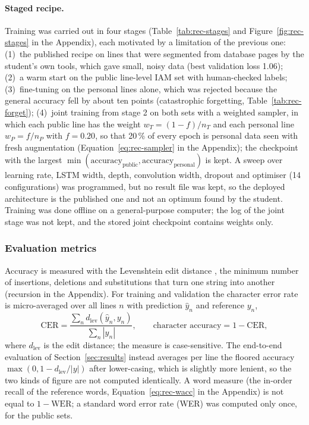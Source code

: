 \paragraph{Staged recipe.}
Training was carried out in four stages (Table~\ref{tab:rec-stages} and Figure~\ref{fig:rec-stages} in the Appendix), each motivated by a limitation of the previous one:
(1)~the published recipe on lines that were segmented from database pages by the student's own tools, which gave small, noisy data (best validation loss 1.06);
(2)~a warm start on the public line-level IAM set with human-checked labels;
(3)~fine-tuning on the personal lines alone, which was rejected because the general accuracy fell by about ten points (catastrophic forgetting, Table~\ref{tab:rec-forget});
(4)~joint training from stage 2 on both sets with a weighted sampler, in which each public line has the weight $w_T=(1-f)/n_T$ and each personal line $w_P=f/n_P$ with $f=0.20$, so that 20\,\% of every epoch is personal data seen with fresh augmentation (Equation~\ref{eq:rec-sampler} in the Appendix); the checkpoint with the largest $\min(\text{accuracy}_{\mathrm{public}},\text{accuracy}_{\mathrm{personal}})$ is kept.
A sweep over learning rate, LSTM width, depth, convolution width, dropout and optimiser (14 configurations) was programmed, but no result file was kept, so the deployed architecture is the published one and not an optimum found by the student.
Training was done offline on a general-purpose computer; the log of the joint stage was not kept, and the stored joint checkpoint contains weights only.

\subsubsection{Evaluation metrics}

Accuracy is measured with the Levenshtein edit distance \cite{levenshtein1966}, the minimum number of insertions, deletions and substitutions that turn one string into another (recursion in the Appendix).
For training and validation the character error rate is micro-averaged over all lines $n$ with prediction $\hat y_n$ and reference $y_n$,
\begin{equation}
\mathrm{CER}=\frac{\sum_nd_{\mathrm{lev}}(\hat y_n,y_n)}{\sum_n|y_n|},\qquad\text{character accuracy}=1-\mathrm{CER},
\label{eq:rec-cer}
\end{equation}
where $d_{\mathrm{lev}}$ is the edit distance; the measure is case-sensitive.
The end-to-end evaluation of Section~\ref{sec:results} instead averages per line the floored accuracy $\max(0,1-d_{\mathrm{lev}}/|y|)$ after lower-casing, which is slightly more lenient, so the two kinds of figure are not computed identically.
A word measure (the in-order recall of the reference words, Equation~\ref{eq:rec-wacc} in the Appendix) is not equal to $1-\mathrm{WER}$; a standard word error rate (WER) was computed only once, for the public sets.

